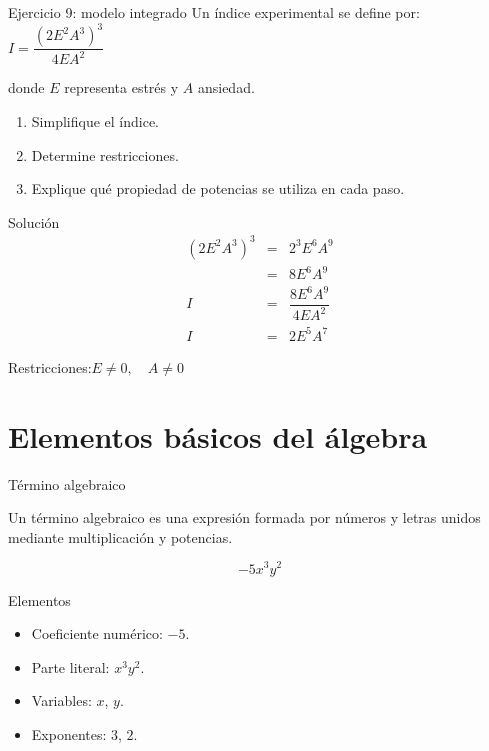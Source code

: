 \documentclass[aspectratio=169]{beamer}
\begin{document}
	\begin{frame}{Ejercicio 9: modelo integrado}
		Un índice experimental se define por: $	I=\dfrac{(2E^2A^3)^3}{4EA^2}$
		
		donde \(E\) representa estrés y \(A\) ansiedad.
		
		\begin{enumerate}
			\item Simplifique el índice.
			\item Determine restricciones.
			\item Explique qué propiedad de potencias se utiliza en cada paso.
		\end{enumerate}
		
		\pause
		
		\begin{block}{Solución}
			\[
			\begin{array}{rcl}
				(2E^2A^3)^3 & = & 2^3E^6A^9 \\[0.3cm]
				& = & 8E^6A^9 \\[0.3cm]
				I           & = & \dfrac{8E^6A^9}{4EA^2} \\[0.3cm]
				I           & = & 2E^5A^7
			\end{array}
			\]
			
			Restricciones:$	E\neq0,\quad A\neq0$
		\end{block}
	\end{frame}
	
	\section{Elementos básicos del álgebra}
		
	\begin{frame}{Término algebraico}
		\begin{idea}
			Un término algebraico es una expresión formada por números y letras unidos mediante multiplicación y potencias.
		\end{idea}
		
		\[
		-5x^3y^2
		\]
		
		\pause
		
		\begin{block}{Elementos}
			\begin{itemize}
				\item Coeficiente numérico: \(-5\).
				\item Parte literal: \(x^3y^2\).
				\item Variables: \(x\), \(y\).
				\item Exponentes: \(3\), \(2\).
			\end{itemize}
		\end{block}
		
		\pause
		
	\end{frame}
	
\end{document}
